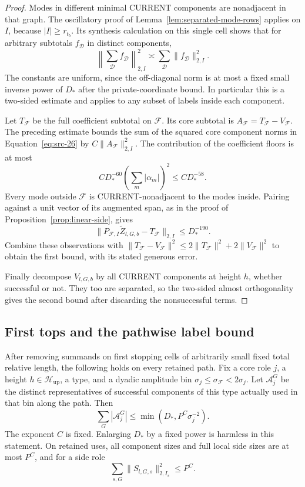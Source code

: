 \begin{proof}
Modes in different minimal CURRENT components are nonadjacent in
that graph.  The oscillatory proof of
Lemma~\ref{lem:separated-mode-rows} applies on \(I\), because
\(|I|\ge r_{t_b}\).  Its synthesis calculation on this single
cell shows that for arbitrary subtotals \(f_{\mathcal D}\) in
distinct components,
\[
 \left\|\sum_{\mathcal D}f_{\mathcal D}\right\|_{2,I}^2
   \asymp\sum_{\mathcal D}\|f_{\mathcal D}\|_{2,I}^2 .
\]
The constants are uniform, since the off-diagonal norm is at most
a fixed small inverse power of \(D_*\) after the private-coordinate
bound.  In particular this is a two-sided estimate and applies
to any subset of labels inside each component.

Let \(T_{\mathcal F}\) be the full coefficient subtotal on
\(\mathcal F\).  Its core subtotal is
\(A_{\mathcal F}=T_{\mathcal F}-V_{\mathcal F}\).
The preceding estimate bounds the sum of the squared core
component norms in Equation~\eqref{eq:src-26} by
\(C\|A_{\mathcal F}\|_{2,I}^2\).
The contribution of the coefficient floors is at most
\[
 C D_*^{-60}\left(\sum_m|\alpha_m|\right)^2
       \le C D_*^{-58}.
\]
Every mode outside \(\mathcal F\) is CURRENT-nonadjacent to the
modes inside.  Pairing against a unit vector of its augmented span,
as in the proof of Proposition~\ref{prop:linear-side}, gives
\[
 \|P_{\mathcal F,I}\widetilde Z_{l,G,b}
                    -T_{\mathcal F}\|_{2,I}\le D_*^{-190}.
\]
Combine these observations with
\(\|T_{\mathcal F}-V_{\mathcal F}\|^2
\le2\|T_{\mathcal F}\|^2+2\|V_{\mathcal F}\|^2\)
to obtain the first bound, with its stated generous error.

Finally decompose \(V_{l,G,b}\) by all CURRENT components at
height \(h\), whether successful or not.  They too are separated,
so the two-sided almost orthogonality gives the second bound after
discarding the nonsuccessful terms.
\end{proof}

\subsection{First tops and the pathwise label bound}

\begin{proposition}
\label{prop:top-count}
After removing summands on first stopping cells of arbitrarily
small fixed total relative length, the following holds on every
retained path.  Fix a core role \(j\), a height
\(h\in\mathcal H_{\mathrm{up}}\), a type, and a dyadic amplitude bin
\(\sigma_j\le\sigma_{\mathcal F}<2\sigma_j\).
Let \(\mathcal A_j^G\) be the distinct representatives of
successful components of this type actually used in that bin
along the path.  Then
\begin{equation*}
 \sum_G|\mathcal A_j^G|
      \le \min(D_*,P^C\sigma_j^{-2}).
 \tag{28}\label{eq:src-28}
\end{equation*}
The exponent \(C\) is fixed.  Enlarging \(D_*\) by a fixed power is
harmless in this statement.  On retained uses, all component sizes
and full local side sizes are at most \(P^C\), and for a side role
\[
 \sum_{s,G}\|S_{l,G,s}\|_{2,I_s}^2\le P^C.
\]
\end{proposition}

